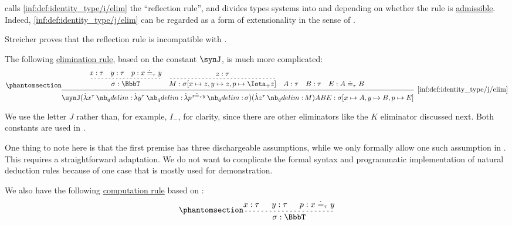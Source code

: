 \begin{definition}
\begin{thmenum}
     calls \ref{inf:def:identity_type/i/elim} the \enquote{reflection rule}, and divides types systems into  and  depending on whether the rule is \hyperref[con:inference_rule_admissibility]{admissible}. Indeed, \ref{inf:def:identity_type/j/elim} can be regarded as a form of extensionality in the sense of .

    Streicher proves that the reflection rule is incompatible with .

     The following \hyperref[rem:type_theory_rule_classification/elim]{elimination rule}, based on the constant \( \synJ \), is much more complicated:
    \small
    \begin{equation*}\taglabel[\ensuremath{ =_-^J }]{inf:def:identity_type/j/elim}
      \begin{prooftree}[separation=1em]
        \hypo{ x: \tau }
        \hypo{ y: \tau }
        \hypo{ p: x \syneq_{\tau} y }
        \infer[dashed]3{ \sigma: \BbbT }

        \hypo{ z: \tau }
        \infer[dashed]1{M: \sigma[x \mapsto z, y \mapsto z, p \mapsto \Iota_+ z]}

        \hypo{ A: \tau }
        \hypo{ B: \tau }
        \hypo{ E: A \syneq_{\tau} B }

        \infer5[\ref{inf:def:identity_type/j/elim}]{ \synJ (\qabs {x^{\tau}} \qabs {y^{\tau}} \qabs {p^{x \syneq_{\tau} y}} \sigma) (\qabs {z^{\tau}} M) A B E: \sigma[x \mapsto A, y \mapsto B, p \mapsto E] }
      \end{prooftree}
    \end{equation*}
    \normalsize

    We use the letter \( J \) rather than, for example, \( I_- \), for clarity, since there are other eliminators like the \( K \) eliminator discussed next. Both constants are used in \cite[6]{Streicher1993IntensionalTypeTheory}.

    One thing to note here is that the first premise has three dischargeable assumptions, while we only formally allow one such assumption in . This requires a straightforward adaptation. We do not want to complicate the formal syntax and programmatic implementation of natural deduction rules because of one case that is mostly used for demonstration.

    We also have the following \hyperref[rem:type_theory_rule_classification/equality/comp]{computation rule} based on \cite[\S A.2.10]{UnivalentFoundationsProgram2024OctoberHoTT}:
    \small
    \begin{equation*}\taglabel[\ensuremath{ =_\beta^J }]{inf:def:identity_type/j/comp}
      \begin{prooftree}
        \hypo{ x: \tau }
        \hypo{ y: \tau }
        \hypo{ p: x \syneq_{\tau} y }
        \infer[dashed]3{\sigma: \BbbT}


\end{prooftree}
\end{equation*}
\end{thmenum}
\end{definition}
